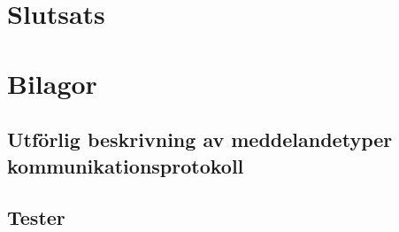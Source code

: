 \documentclass{article}
\begin{document}
\section{Slutsats}





\section{Bilagor}
    \subsection{Utförlig beskrivning av meddelandetyper kommunikationsprotokoll}
    \label{bilaga:protokoll}
        
        
	\clearpage
	\subsection{Tester}
    		\label{bilaga:tester}
     	
     	
\end{document}
